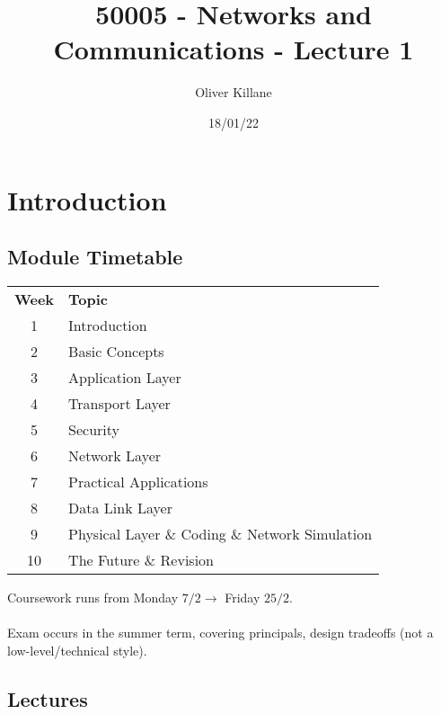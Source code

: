 \documentclass{report}
\title{50005 - Networks and Communications - Lecture 1}
\author{Oliver Killane}
\date{18/01/22}
\begin{document}
\maketitle
{}

\section*{Introduction}
\subsection*{Module Timetable}
\begin{center}
	\begin{tabular}{c l}
		\textbf{Week} & \textbf{Topic}                                 \\
		1             & Introduction                                   \\
		2             & Basic Concepts                                 \\
		3             & Application Layer                              \\
		4             & Transport Layer                                \\
		5             & Security                                       \\
		6             & Network Layer                                  \\
		7             & Practical Applications                         \\
		8             & Data Link Layer                                \\
		9             & Physical Layer \& Coding \& Network Simulation \\
		10            & The Future \& Revision                         \\
	\end{tabular}
\end{center}
Coursework runs from Monday $7/2 \to$ Friday $25/2$.
\\
\\ Exam occurs in the summer term, covering principals, design tradeoffs (not a low-level/technical style).


\subsection*{Lectures}
\end{document}
